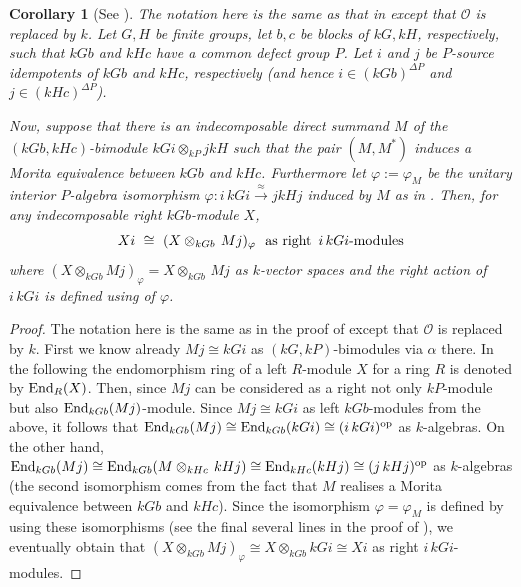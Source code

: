 \documentclass[12pt,a4paper]{amsart}
\theoremstyle{plain}\newtheorem{Theorem}{Theorem}[section]
\theoremstyle{plain}\newtheorem{Conjecture}[Theorem]{Conjecture}
\theoremstyle{plain}\newtheorem{Corollary}[Theorem]{Corollary}
\theoremstyle{plain}\newtheorem{Lemma}[Theorem]{Lemma}
\theoremstyle{plain}\newtheorem{Proposition}[Theorem]{Proposition}
\theoremstyle{definition}\newtheorem{Definition}[Theorem]{Definition}
\theoremstyle{definition}\newtheorem{Example}[Theorem]{Example}
\theoremstyle{definition}\newtheorem{Examples}[Theorem]{Examples}
\theoremstyle{definition}\newtheorem{Remark}[Theorem]{Remark}
\theoremstyle{definition}\newtheorem{Question}[Theorem]{Question}
\theoremstyle{definition}\newtheorem{Notation}[Theorem]{Notation}
\theoremstyle{definition}\newtheorem{Hypothesis}[Theorem]{Hypothesis}
\theoremstyle{definition}\newtheorem{Assumption}[Theorem]{Assumption}
\theoremstyle{definition}\newtheorem{Strategy}[Theorem]{Strategy}
\theoremstyle{definition}\newtheorem{Contents}[Theorem]{Contents}
\theoremstyle{definition}\newtheorem{Computations}[Theorem]{Computations}
\theoremstyle{definition}\newtheorem{Equivalences}[Theorem]{Equivalences}
\theoremstyle{definition}\newtheorem{Notation/Definition}[Theorem]{Notation/Definition}
\theoremstyle{definition}\newtheorem{noth}[Theorem]{}
\theoremstyle{plain}\newtheorem{Step}[Theorem]{Step}
\begin{document}
\begin{Corollary}[{}{See \cite[Theorem 9.7.4]{Lin18}}]\label{cor:Lin18-9.7.4}
The notation here is the same as that in \cite{Lin18} except that $\mathcal O$ is replaced by $k$.
Let $G, H$ be finite groups, let $b, c$ be blocks of $kG, kH$, respectively,
such that $kGb$ and $kHc$ have a common defect group $P$. Let $i$ and $j$ be
$P$-source idempotents of $kGb$ and $kHc$, respectively 
(and hence $i\in(kGb)^{\Delta P}$ and $j\in(kHc)^{\Delta P}$).
\par
Now, suppose that there is an indecomposable direct summand $M$ of the
$(kGb, kHc)$-bimodule $kGi\otimes_{kP}jkH$ such that the pair $(M, M^*)$ induces a Morita 
equivalence between $kGb$ and $kHc$.
Furthermore let $\varphi:=\varphi_M$ be the unitary interior $P$-algebra isomorphism 
${\varphi:i\,kG i\overset{\approx}{\rightarrow} j kHj}$ induced by $M$ as in
\cite[Theorem 9.7.4]{Lin18}.
Then, for any indecomposable right $kGb$-module $X$, 
\[Xi \ \cong \ (X\otimes_{kGb}\,Mj)_\varphi\text{ \ as right \,}i\,kG i\text{-modules}\]
where $(X\otimes_{kGb}Mj)_\varphi = X\otimes_{kGb}\,Mj$
as $k$-vector spaces and the right action of $i\,kGi$ is defined  using of $\varphi$.
\end{Corollary}

\begin{proof}
The notation here is the same as in the proof of \cite[(i) $\Rightarrow$ (ii) in Theorem~9.7.4]{Lin18}
except that $\mathcal O$ is replaced by $k$.
First we know already $Mj\cong kGi$ as $(kG, kP)$-bimodules via $\alpha$ there.
In the following the endomorphism ring of a left $R$-module $X$ for a ring $R$ is denoted by $\mathrm{End}_R(X)$.
Then, since $Mj$ can be considered as a right not only $kP$-module but also $\mathrm{End}_{kGb}(Mj)$-module.
Since $Mj\cong kGi$ as left $kGb$-modules from the above,
it follows that $\mathrm{End}_{kGb}(Mj)\cong\mathrm{End}_{kGb}(kGi)\cong (i\,kGi)^{\text{op}}$ as $k$-algebras.
On the other hand, 
$\mathrm{End}_{kGb}(Mj)\cong\mathrm{End}_{kGb}(M\otimes_{kHc}\,kHj)\cong\mathrm{End}_{kHc}(kHj)\cong (j\,kHj)^{\text{op}}$ as
$k$-algebras
(the second isomorphism comes from the fact that
$M$ realises a Morita equivalence between $kGb$ and $kHc$). 
Since the isomorphism $\varphi=\varphi_M$ is defined by using these isomorphisms
(see the final several lines in the proof of \cite[(i) $\Rightarrow$ (ii) in Theorem~9.7.4]{Lin18}),
we eventually obtain that 
$(X \otimes_{kGb}Mj)_\varphi \cong X\otimes_{kGb} kGi\cong Xi$ as right $i\,kGi$-modules.
\end{proof}
\end{document}

